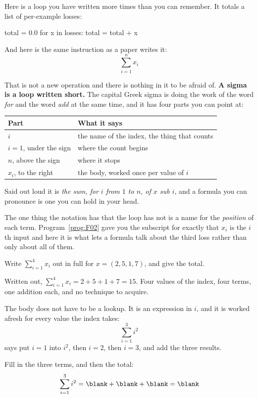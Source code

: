 \begin{fr}
Here is a loop you have written more times than you can remember. It totals a
list of per-example losses:

\begin{python}
total = 0.0
for x in losses:
    total = total + x
\end{python}

And here is the same instruction as a paper writes it:
\[ \sum_{i=1}^{n} x_i \]

That is not a new operation and there is nothing in it to be afraid of.
\textbf{A sigma is a loop written short.} The capital Greek sigma is doing the
work of the word \emph{for} and the word \emph{add} at the same time, and it
has four parts you can point at:

\begin{center}
\begin{tabular}{ll}
\toprule
Part & What it says \\
\midrule
$i$ & the name of the index, the thing that counts \\
$i = 1$, under the sign & where the count begins \\
$n$, above the sign & where it stops \\
$x_i$, to the right & the body, worked once per value of $i$ \\
\bottomrule
\end{tabular}
\end{center}

Said out loud it is \emph{the sum, for $i$ from $1$ to $n$, of $x$ sub $i$},
and a formula you can pronounce is one you can hold in your head.

The one thing the notation has that the loop has not is a name for the
\emph{position} of each term. Program~\ref{prog:F02} gave you the subscript
for exactly that \dash{} $x_i$ is the $i$th input \dash{} and here it is what
lets a formula talk about the third loss rather than only about all of them.

Write $\sum_{i=1}^{4} x_i$ out in full for $x = (2, 5, 1, 7)$, and give the
total.
\nextframe
\end{fr}

\begin{fr}
Written out, $\sum_{i=1}^{4} x_i = 2 + 5 + 1 + 7 = 15$. Four values of the
index, four terms, one addition each, and no technique to acquire.

The body does not have to be a lookup. It is an expression in $i$, and it is
worked afresh for every value the index takes:
\[ \sum_{i=1}^{3} i^{2} \]
says put $i = 1$ into $i^{2}$, then $i = 2$, then $i = 3$, and add the three
results.

Fill in the three terms, and then the total:
\[ \sum_{i=1}^{3} i^{2} = \blank + \blank + \blank = \blank \]
\dotline
\nextframe
\end{fr}

